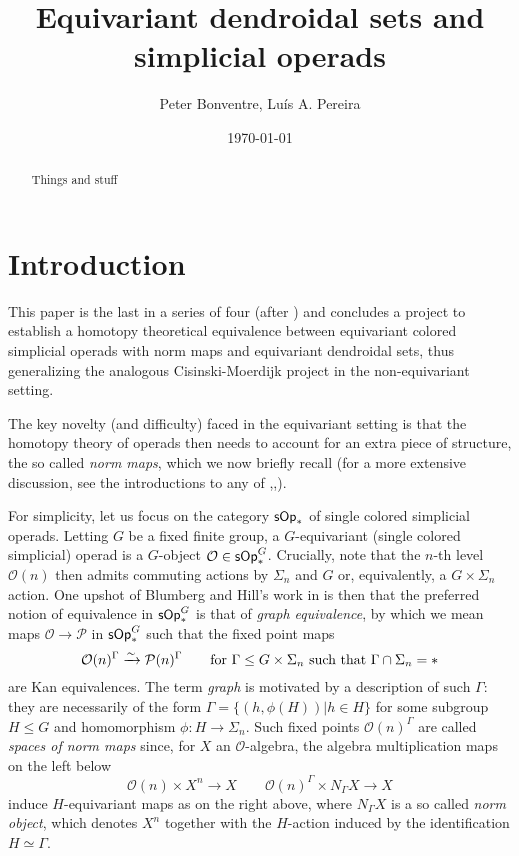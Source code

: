 \documentclass[a4paper,10pt
,draft
]{article}%
\title{Equivariant dendroidal sets and simplicial operads}
\author{Peter Bonventre, Lu\'is A. Pereira}%
\date{\today}
\numberwithin{equation}{section}
\numberwithin{figure}{section}
\theoremstyle{definition} %
\renewcommand{\O}{\ensuremath{\mathcal O}}
\newcommand{\1}{\ensuremath{\mathbbm 1}}%
\begin{document}
\maketitle

\begin{abstract}
      Things and stuff
\end{abstract}

\tableofcontents


\section{Introduction}

This paper is the last in a series of four
(after \cite{Per18,BP_edss,BP_HGOP})
and concludes a project to establish a homotopy theoretical equivalence
between equivariant colored simplicial operads with norm maps
and equivariant dendroidal sets,
thus generalizing the analogous 
Cisinski-Moerdijk project 
\cite{CM13a,CM13b,CM11}
in the non-equivariant setting.

The key novelty (and difficulty) faced in the equivariant setting is that the homotopy theory of operads
then needs to account for an 
extra piece of structure,
the so called \emph{norm maps},
which we now briefly recall
(for a more extensive discussion, 
see the introductions to any of
\cite{Per18},\cite{BP_geo},\cite{BP_HGOP}).

For simplicity,
let us focus on the category
$\mathsf{sOp}_{\**}$
of single colored simplicial operads.
Letting $G$ be a fixed finite group,
a $G$-equivariant (single colored simplicial) operad
is a $G$-object
$\O \in \mathsf{sOp}_{\**}^G$.
Crucially, 
note that the $n$-th level
$\O(n)$ then admits commuting actions
by $\Sigma_n$ and $G$ or, equivalently,
a $G \times \Sigma_n$ action.
One upshot of Blumberg and Hill's work in 
\cite{BH15}
is then that the preferred notion of equivalence
in $\mathsf{sOp}_{\**}^G$
is that of \emph{graph equivalence},
by which we mean maps
$\mathcal{O} \to \mathcal{P}$
in $\mathsf{sOp}_{\**}^G$
such that the fixed point maps
\[
	\mathcal{O}(n)^{\Gamma}
	\xrightarrow{\sim}
	\mathcal{P}(n)^{\Gamma}
\qquad
	\text{for }
	\Gamma \leq G \times \Sigma_n
	\text{ such that }
	\Gamma \cap \Sigma_n = \**
\]
are Kan equivalences.
The term \emph{graph} is motivated by a description of such $\Gamma$:
they are necessarily of the form
$\Gamma = \{(h,\phi(H)) | h \in H\}$
for some subgroup $H \leq G$
and homomorphism $\phi \colon H \to \Sigma_n$.
Such fixed points $\mathcal{O}(n)^{\Gamma}$
are called 
\emph{spaces of norm maps}
since, for $X$ an $\O$-algebra,
the algebra multiplication maps
on the left below
\[
	\O(n) \times X^n \to X
\qquad
	\O(n)^{\Gamma} \times N_{\Gamma} X \to X
\]
induce $H$-equivariant maps as on the right above,
where 
$N_{\Gamma} X$ is a so called 
\emph{norm object},
which denotes $X^n$ together with the $H$-action induced by the identification $H \simeq \Gamma$.
\end{document}
